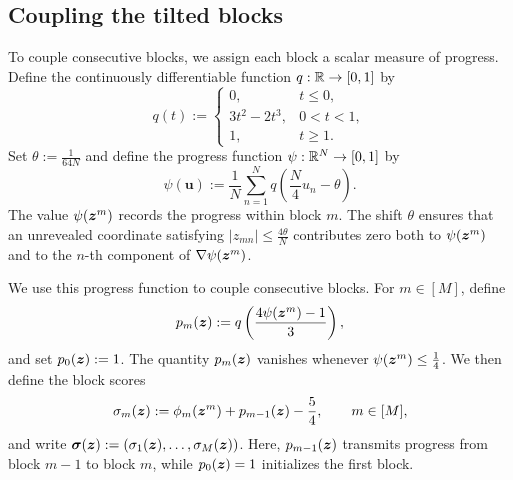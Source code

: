 \subsection{Coupling the tilted blocks}
\label{subsec:block-coupling} 
To couple consecutive blocks, we assign each block a scalar
measure of progress. Define the continuously differentiable
function $q:{\mathbb{R}}\to[0,1]$ by
\[
 q(t)
 :=
 \begin{cases}
  0, & t\le0,\\
  3t^2-2t^3, & 0<t<1,\\
  1, & t\ge1.
 \end{cases}
\]
Set $\theta:=\tfrac{1}{64N}$ and define the progress function
$\psi:{\mathbb{R}}^N\to[0,1]$ by 
\[
 \psi(\bm{u})
 :=
 \frac1N\sum_{n=1}^N
 q\left(\frac N4u_n-\theta\right).
\] 
The value $\psi(\bm{z}^m)$ records the progress within block $m$.
The shift $\theta$ ensures that an unrevealed coordinate
satisfying $|z_{mn}|\le\tfrac{4\theta}{N}$ contributes zero both
to $\psi(\bm{z}^m)$ and to the $n$-th component of
$\nabla\psi(\bm{z}^m)$.

We use this progress function to couple consecutive blocks.
For $m\in[M]$, define
\begin{equation}
 p_m(\bm{z})
 :=q\left(\frac{4\psi(\bm{z}^m)-1}{3}\right),
 \label{newrand:gate}
\end{equation}
and set $p_0(\bm{z}):=1$.
The quantity $p_m(\bm{z})$ vanishes whenever
$\psi(\bm{z}^m)\le\tfrac14$.
We then define the block scores
\[
 \sigma_m(\bm{z})
 :=\phi_m(\bm{z}^m)+p_{m-1}(\bm{z})-\frac54,
 \qquad m\in[M],
\]
and write
$\boldsymbol{\sigma}(\bm{z}):=(\sigma_1(\bm{z}),\ldots,\sigma_M(\bm{z}))$.
Here, $p_{m-1}(\bm{z})$ transmits progress from block $m-1$
to block $m$, while $p_0(\bm{z})=1$ initializes the first block.

